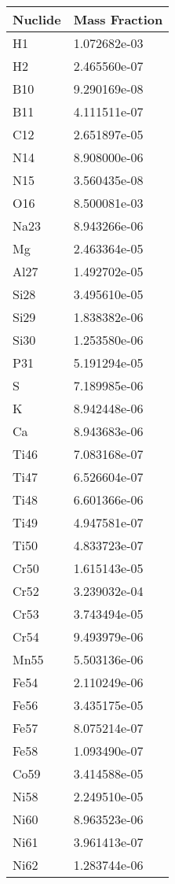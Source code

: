 \begin{centering}
\begin{longtable}[ht!]
\caption{Table showing the isotopic description of material M611}
\label{table:material_M611}
\end{longtable}\clearpage

\begin{longtable}[ht!]
{ p{} | p{} }
\hline
Nuclide & Mass Fraction\\
\hline
H1 & 1.072682e-03\\
H2 & 2.465560e-07\\
B10 & 9.290169e-08\\
B11 & 4.111511e-07\\
C12 & 2.651897e-05\\
N14 & 8.908000e-06\\
N15 & 3.560435e-08\\
O16 & 8.500081e-03\\
Na23 & 8.943266e-06\\
Mg & 2.463364e-05\\
Al27 & 1.492702e-05\\
Si28 & 3.495610e-05\\
Si29 & 1.838382e-06\\
Si30 & 1.253580e-06\\
P31 & 5.191294e-05\\
S & 7.189985e-06\\
K & 8.942448e-06\\
Ca & 8.943683e-06\\
Ti46 & 7.083168e-07\\
Ti47 & 6.526604e-07\\
Ti48 & 6.601366e-06\\
Ti49 & 4.947581e-07\\
Ti50 & 4.833723e-07\\
Cr50 & 1.615143e-05\\
Cr52 & 3.239032e-04\\
Cr53 & 3.743494e-05\\
Cr54 & 9.493979e-06\\
Mn55 & 5.503136e-06\\
Fe54 & 2.110249e-06\\
Fe56 & 3.435175e-05\\
Fe57 & 8.075214e-07\\
Fe58 & 1.093490e-07\\
Co59 & 3.414588e-05\\
Ni58 & 2.249510e-05\\
Ni60 & 8.963523e-06\\
Ni61 & 3.961413e-07\\
Ni62 & 1.283744e-06\\

\end{longtable}
\end{centering}
